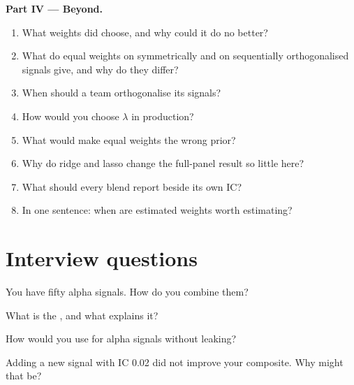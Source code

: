 \begin{problem}
\medskip\noindent\textbf{Part IV --- Beyond.}
\begin{enumerate}[resume]
\item What weights did  choose, and why could it do no better?
\item What do equal weights on symmetrically and on sequentially orthogonalised signals give, and why do they differ?
\item When should a team orthogonalise its signals?
\item How would you choose $\lambda$ in production?
\item What would make equal weights the wrong prior?
\item Why do ridge and lasso change the full-panel result so little here?
\item What should every blend report beside its own IC?
\item In one sentence: when are estimated weights worth estimating?
\end{enumerate}
\end{problem}

\section{Interview questions}

\begin{interviewq}\label{iq:rs:signal-combination:1}
You have fifty alpha signals. How do you combine them?
\end{interviewq}

\begin{interviewq}\label{iq:rs:signal-combination:2}
What is the , and what explains it?
\end{interviewq}

\begin{interviewq}\label{iq:rs:signal-combination:3}
How would you use  for alpha signals without leaking?
\end{interviewq}

\begin{interviewq}\label{iq:rs:signal-combination:4}
Adding a new signal with IC 0.02 did not improve your composite. Why might that be?
\end{interviewq}

